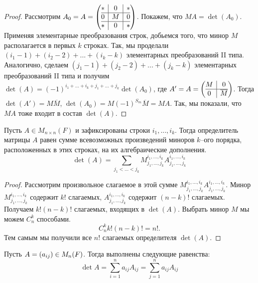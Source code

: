 \begin{proof}
    Рассмотрим $A_{0} = A = \left(\begin{array}{@{}c|c|c@{}}
	* & 0 & *\\
	\hline
	0 & M & 0\\
	\hline
	* & 0 & *
	\end{array}\right)$. Покажем, что $M A = \det(A_{0})$. Применяя элементарные преобразования строк, добьемся того, что минор $M$ располагается в первых $k$ строках. Так, мы проделали $(i_{1} - 1) + (i_{2} - 2) + ... + (i_{k} - k)$ элементарных преобразований II типа. Аналогично, сделаем $(j_{1} - 1) + (j_{2} - 2) + ... + (j_{k} - k)$ элементарных преобразований II типа и получим $\det(A) = (-1)^{i_1 + ... + i_k + j_1 + ... + j_k} \det(A_{0})$, где $A' = A = \left(\begin{array}{@{}c|c@{}}
    		M & 0\\
    		\hline
    		0 & \overline{M}
    	\end{array}\right)$. Тогда $\det(A') = M \overline{M}$, $\det(A_0) = M (-1)^{S_{m}} \overline{M} = M A$. Так, мы показали, что $M A$ тоже входит в состав $\det(A)$.
\end{proof}

\begin{theorem}[Лапласа]
    Пусть $A \in M_{n \times n}(F)$ и зафиксированы строки $i_{1}, ..., i_{k}$. Тогда определитель матрицы $A$ равен сумме всевозможных произведений миноров $k$--ого порядка, расположенных в этих строках, на их алгебраические дополнения.
    \[\det(A) = \sum_{j_{1} < ... < j_{k}} M_{j_{1}, ..., j_{k}}^{i_{1}, ..., i_{k}} A_{j_{1}, ..., j_{k}}^{i_{1}, ..., i_{k}}\]
\end{theorem}

\begin{proof}
    Рассмотрим произвольное слагаемое в этой сумме $M_{j_{1}, ..., j_{k}}^{i_{1}, ..., i_{k}} A_{j_{1}, ..., j_{k}}^{i_{1}, ..., i_{k}}$. Минор $M_{j_{1}, ..., j_{k}}^{i_{1}, ..., i_{k}}$ содержит $k!$ слагаемых, $A_{j_{1}, ..., j_{k}}^{i_{1}, ..., i_{k}}$ содержит $(n-k)!$ слагаемых. Получаем $k! (n-k)!$ слагаемых, входящих в $\det(A)$. Выбрать минор $M$ мы можем $C_{n}^{k}$ способами.
    \[C_{n}^{k} k! (n-k)! = n!.\]
    Тем самым мы получили все $n!$ слагаемых определителя $\det(A)$.
\end{proof}

\begin{theorem}
	Пусть $A = (a_{ij}) \hm{\in} M_n(F)$. Тогда выполнены следующие равенства:
	\[\det{A} = \sum_{i = 1}^na_{ij}A_{ij} = \sum_{j = 1}^na_{ij}A_{ij}\]
\end{theorem}

